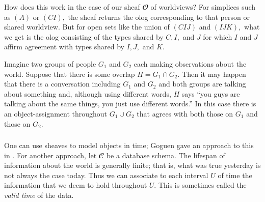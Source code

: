 \documentclass[../main/CT4S-EN-RU]{subfiles}
\begin{document}
\begin{blockRUS}
\end{blockRUS}

\begin{blockENG}
How does this work in the case of our sheaf ${𝓞}$ of worldviews? For simplices such as $(A)$ or $(CI),$ the sheaf returns the olog corresponding to that person or shared worldview. But for open sets like the union of $(CIJ)$ and $(IJK),$ what we get is the olog consisting of the types shared by $C, I,$ and $J$ for which $I$ and $J$ affirm agreement with types shared by $I, J,$ and $K.$
\end{blockENG}

\begin{blockRUS}
\end{blockRUS}

\begin{exampleENG}
Imagine two groups of people $G_1$ and $G_2$ each making observations about the world. Suppose that there is some overlap $H=G_1\cap G_2.$ Then it may happen that there is a conversation including $G_1$ and $G_2$ and both groups are talking about something and, although using different words, $H$ says “you guys are talking about the same things, you just use different words.” In this case there is an object-assignment throughout $G_1\cup G_2$ that agrees with both those on $G_1$ and those on $G_2.$
\end{exampleENG}

\begin{exampleRUS}
\end{exampleRUS}


\subsubsection{}

\begin{blockENG}
One can use sheaves to model objects in time; Goguen gave an approach to this in \cite{Gog}. For another approach, let ${𝓒}$ be a database schema. The lifespan of information about the world is generally finite; that is, what was true yesterday is not always the case today. Thus we can associate to each interval $U$ of time the information that we deem to hold throughout $U.$ This is sometimes called the {\em valid time} of the data.
\end{blockENG}
\end{document}
